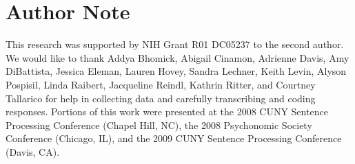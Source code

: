 \documentclass[12pt,titlepage]{article}
\begin{document}
\clearpage

\section[Author Note]{\center Author Note}

This research was supported by NIH Grant R01 DC05237 to the second author.
We would like to thank Addya Bhomick, Abigail Cinamon, Adrienne Davis, Amy
DiBattista, Jessica Eleman, Lauren Hovey, Sandra Lechner, Keith Levin,
Alyson Pospisil, Linda Raibert, Jacqueline Reindl, Kathrin Ritter, and
Courtney Tallarico for help in collecting data and carefully transcribing
and coding responses.  Portions of this work were presented at the 2008
CUNY Sentence Processing Conference (Chapel Hill, NC), the 2008 Psychonomic
Society Conference (Chicago, IL), and the 2009 CUNY Sentence Processing
Conference (Davis, CA)\@.
\end{document}
